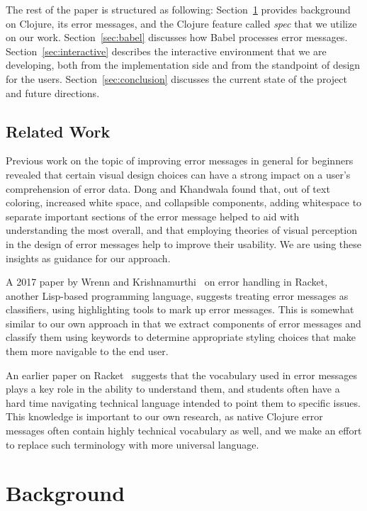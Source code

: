 \documentclass[12pt]{article}
\begin{document}
The rest of the paper is structured as following:
Section~\ref{sec:background} provides background on Clojure, its error messages, and the Clojure feature called {\it spec} that we utilize on our work. Section~\ref{sec:babel} discusses how Babel processes error messages. 
Section~\ref{sec:interactive} describes the interactive environment that we are developing, both from the implementation side and from the standpoint of design for the users. 
Section~\ref{sec:conclusion} discusses the current state of the project and future directions.  

\subsection{Related Work}\label{subsec:related}

Previous work on the topic of improving error messages in general for beginners~\cite{cosmetic} revealed that 
certain visual design choices can have a strong impact on a user's comprehension of error data. Dong and Khandwala found that, 
out of text coloring, increased white space, and collapsible components, adding whitespace to separate important sections of the 
error message helped to aid with understanding the most overall, and that employing theories of visual perception in the design 
of error messages help to improve their usability. 
We are using these insights as guidance for our approach.

A 2017 paper by Wrenn and Krishnamurthi~\cite{classifiers} on error handling in Racket, another Lisp-based programming language, 
suggests treating error messages as classifiers, using highlighting tools to mark up error messages. This is somewhat similar to 
our own approach in that we extract components of error messages and classify them using keywords to determine appropriate styling 
choices that make them more navigable to the end user.

An earlier paper on Racket~\cite{language} suggests that the vocabulary used in error messages plays a key role in the ability to
understand them, and students often have a hard time navigating technical language intended to point them to specific issues. This
knowledge is important to our own research, as native Clojure error messages often contain highly technical vocabulary as well, and 
we make an effort to replace such terminology with more universal language.

\section{Background}\label{sec:background}
\end{document}
